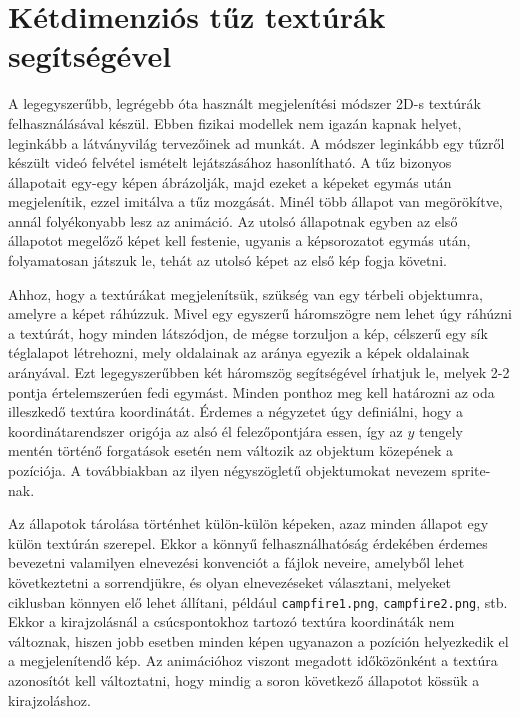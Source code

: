 

\section{Kétdimenziós tűz textúrák segítségével}

A legegyszerűbb, legrégebb óta használt megjelenítési módszer 2D-s textúrák felhasználásával készül. Ebben fizikai modellek nem igazán kapnak helyet, leginkább a látványvilág tervezőinek ad munkát. A módszer leginkább egy tűzről készült videó felvétel ismételt lejátszásához hasonlítható. A tűz bizonyos állapotait egy-egy képen ábrázolják, majd ezeket a képeket egymás után megjelenítik, ezzel imitálva a tűz mozgását. Minél több állapot van megörökítve, annál folyékonyabb lesz az animáció. Az utolsó állapotnak egyben az első állapotot megelőző képet kell festenie, ugyanis a képsorozatot egymás után, folyamatosan játszuk le, tehát az utolsó képet az első kép fogja követni.

Ahhoz, hogy a textúrákat megjelenítsük, szükség van egy térbeli objektumra, amelyre a képet ráhúzzuk. Mivel egy egyszerű háromszögre nem lehet úgy ráhúzni a textúrát, hogy minden látszódjon, de mégse torzuljon a kép, célszerű egy sík téglalapot létrehozni, mely oldalainak az aránya egyezik a képek oldalainak arányával. Ezt legegyszerűbben két háromszög segítségével írhatjuk le, melyek 2-2 pontja értelemszerúen fedi egymást. Minden ponthoz meg kell határozni az oda illeszkedő textúra koordinátát. Érdemes a négyzetet úgy definiálni, hogy a koordinátarendszer origója az alsó él felezőpontjára essen, így az $y$ tengely mentén történő forgatások esetén nem változik az objektum közepének a pozíciója. A továbbiakban az ilyen négyszögletű objektumokat nevezem sprite-nak.

Az állapotok tárolása történhet külön-külön képeken, azaz minden állapot egy külön textúrán szerepel. Ekkor a könnyű felhasználhatóság érdekében érdemes bevezetni valamilyen elnevezési konvenciót a fájlok neveire, amelyből lehet következtetni a sorrendjükre, és olyan elnevezéseket választani, melyeket ciklusban könnyen elő lehet állítani, például \texttt{campfire1.png}, \texttt{campfire2.png}, stb. Ekkor a kirajzolásnál a csúcspontokhoz tartozó textúra koordináták nem változnak, hiszen jobb esetben minden képen ugyanazon a pozíción helyezkedik el a megjelenítendő kép. Az animációhoz viszont megadott időközönként a textúra azonosítót kell változtatni, hogy mindig a soron következő állapotot kössük a kirajzoláshoz.

